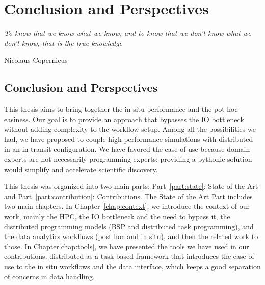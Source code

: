 \chapter{Conclusion and Perspectives}
\vspace{20mm}
\epigraph{\textit{To know that we know what we know, and to know that we don't know what we don't know, that is the true knowledge}} {Nicolaus Copernicus}

\newpage

\section{Conclusion and Perspectives}


This thesis aims to bring together the in situ performance and the pot hoc easiness. Our goal is to provide an approach that bypasses the IO bottleneck without adding complexity to the workflow setup. 
Among all the possibilities we had, we have proposed to couple high-performance simulations with \dask distributed in an in transit configuration.   
We have favored the ease of use because domain experts are not necessarily programming experts; providing a pythonic solution would simplify and accelerate scientific discovery.   

This thesis was organized into two main parts: Part~\ref{part:state}: State of the Art and Part~\ref{part:contribution}: Contributions. 
The State of the Art Part includes two main chapters. In Chapter~\ref{chap:context}, we introduce the context of our work, mainly the HPC, the IO bottleneck and the need to bypass it, the distributed programming models (BSP and distributed task programming), and the data analytics workflows (post hoc and in situ), and then the related work to those. 
In Chapter\ref{chap:tools}, we have presented the tools we have used in our contributions. \dask distributed as a task-based framework that introduces the ease of use to the in situ workflows and the \pdi data interface, which keeps a good separation of concerns in data handling.    

